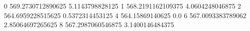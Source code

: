 0 569.2730712890625 5.1143798828125
1 568.2191162109375 4.0604248046875
2 564.6959228515625 0.5372314453125
4 564.15869140625 0.0
6 567.0093383789062 2.85064697265625
8 567.2987060546875 3.1400146484375
